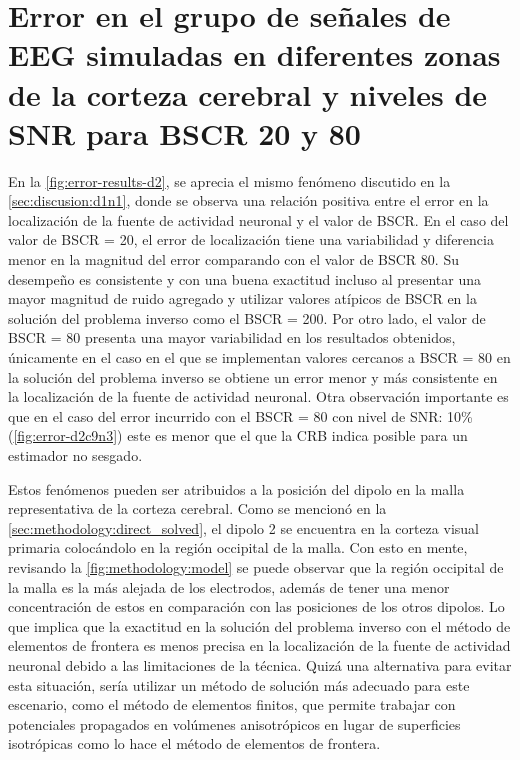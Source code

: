 \section{Error en el grupo de señales de EEG simuladas en
diferentes zonas de la corteza cerebral y niveles de
SNR para BSCR 20 y 80}

En la \cref{fig:error-results-d2}, se aprecia el mismo fenómeno discutido en la \cref{sec:discusion:d1n1}, donde se observa una relación positiva entre el error en la localización de la fuente de actividad neuronal y el valor de BSCR.
En el caso del valor de BSCR = 20, el error de localización tiene una variabilidad y diferencia menor en la magnitud del error comparando con el valor de BSCR 80.
Su desempeño es consistente y con una buena exactitud incluso al presentar una mayor magnitud de ruido agregado y utilizar valores atípicos de BSCR en la solución del problema inverso como el BSCR = 200.
Por otro lado, el valor de BSCR = 80 presenta una mayor variabilidad en los resultados obtenidos, únicamente en el caso en el que se implementan valores cercanos a BSCR = 80 en la solución del problema inverso se obtiene un error menor y más consistente en la localización de la fuente de actividad neuronal.
Otra observación importante es que en el caso del error incurrido con el BSCR = 80 con nivel de SNR: 10\% (\cref{fig:error-d2c9n3}) este es menor que el que la CRB indica posible para un estimador no sesgado.

Estos fenómenos pueden ser atribuidos a la posición del dipolo en la malla representativa de la corteza cerebral. 
Como se mencionó en la \cref{sec:methodology:direct_solved}, el dipolo 2 se encuentra en la corteza visual primaria colocándolo en la región occipital de la malla.
Con esto en mente, revisando la \cref{fig:methodology:model} se puede observar que la región occipital de la malla es la más alejada de los electrodos, además de tener una menor concentración de estos en comparación con las posiciones de los otros dipolos. 
Lo que implica que la exactitud en la solución del problema inverso con el método de elementos de frontera es menos precisa en la localización de la fuente de actividad neuronal debido a las limitaciones de la técnica.
Quizá una alternativa para evitar esta situación, sería utilizar un método de solución más adecuado para este escenario, como el método de elementos finitos, que permite trabajar con potenciales propagados en volúmenes anisotrópicos en lugar de superficies isotrópicas como lo hace el método de elementos de frontera.


